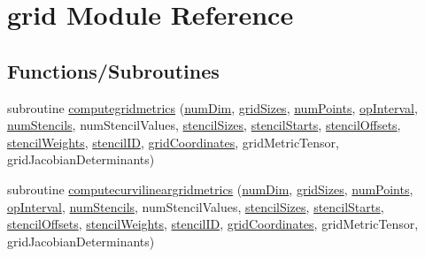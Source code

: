 \hypertarget{namespacegrid}{}\section{grid Module Reference}
\label{namespacegrid}
\subsection*{Functions/\+Subroutines}
\begin{DoxyCompactItemize}
\item 
subroutine \hyperlink{namespacegrid_aa7be0a201b7b8462fb9c99fde93464c6}{computegridmetrics} (\hyperlink{SATKernels_8H_a680185db8546de161968dabace9e94f1}{num\+Dim}, \hyperlink{ViscidKernels_8H_a969a5d6106eec8b7096250b27865b9ba}{grid\+Sizes}, \hyperlink{ViscidKernels_8H_adf0bf75d0875d1bb42a5348bee7b7bfd}{num\+Points}, \hyperlink{WENOKernels_8H_a23d86f4608a92738225f87574392b273}{op\+Interval}, \hyperlink{OperatorKernels_8H_a3ebb77d78da88e132f012ab6788ff123}{num\+Stencils}, num\+Stencil\+Values, \hyperlink{OperatorKernels_8H_ad36f7e6638c24dc8cce030ebb48e32a4}{stencil\+Sizes}, \hyperlink{OperatorKernels_8H_ab81c9b92fc99d6a20e08f1ad1c9630b0}{stencil\+Starts}, \hyperlink{OperatorKernels_8H_aace4e878476c6638c99ce2be58848e52}{stencil\+Offsets}, \hyperlink{OperatorKernels_8H_a71782584f6f521c3d69ed8a53fbbbd59}{stencil\+Weights}, \hyperlink{OperatorKernels_8H_a681701e0402fff5dd66637c1c99e34aa}{stencil\+ID}, \hyperlink{WENOKernels_8H_a55f433dcd5ee1a2b6a9d73ce18fcaa58}{grid\+Coordinates}, grid\+Metric\+Tensor, grid\+Jacobian\+Determinants)
\item 
subroutine \hyperlink{namespacegrid_a7424cadee63bb7574ca7cf11cf49714b}{computecurvilineargridmetrics} (\hyperlink{SATKernels_8H_a680185db8546de161968dabace9e94f1}{num\+Dim}, \hyperlink{ViscidKernels_8H_a969a5d6106eec8b7096250b27865b9ba}{grid\+Sizes}, \hyperlink{ViscidKernels_8H_adf0bf75d0875d1bb42a5348bee7b7bfd}{num\+Points}, \hyperlink{WENOKernels_8H_a23d86f4608a92738225f87574392b273}{op\+Interval}, \hyperlink{OperatorKernels_8H_a3ebb77d78da88e132f012ab6788ff123}{num\+Stencils}, num\+Stencil\+Values, \hyperlink{OperatorKernels_8H_ad36f7e6638c24dc8cce030ebb48e32a4}{stencil\+Sizes}, \hyperlink{OperatorKernels_8H_ab81c9b92fc99d6a20e08f1ad1c9630b0}{stencil\+Starts}, \hyperlink{OperatorKernels_8H_aace4e878476c6638c99ce2be58848e52}{stencil\+Offsets}, \hyperlink{OperatorKernels_8H_a71782584f6f521c3d69ed8a53fbbbd59}{stencil\+Weights}, \hyperlink{OperatorKernels_8H_a681701e0402fff5dd66637c1c99e34aa}{stencil\+ID}, \hyperlink{WENOKernels_8H_a55f433dcd5ee1a2b6a9d73ce18fcaa58}{grid\+Coordinates}, grid\+Metric\+Tensor, grid\+Jacobian\+Determinants)

\end{DoxyCompactItemize}

